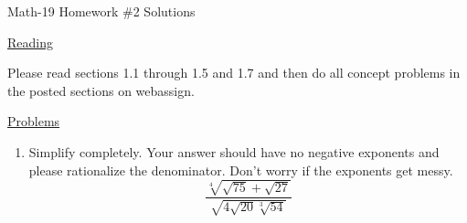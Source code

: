 \documentclass[letterpaper,12pt,fleqn]{article}
\begin{document}
\begin{center}
\Large Math-19 Homework \#2 Solutions
\end{center}

\vspace{0.5in}

\underline{Reading}

Please read sections 1.1 through 1.5 and 1.7 and then do all concept problems
in the posted sections on web\-assign.

\underline{Problems}

\begin{enumerate}
\item Simplify completely. Your answer should have no negative exponents and
please rationalize the denominator. Don't worry if the exponents get messy.
\[\frac{\sqrt[4]{\sqrt{75}+\sqrt{27}}}{\sqrt{4\sqrt{20}\sqrt[3]{54}}}\]

\bigskip


\end{enumerate}
\end{document}
